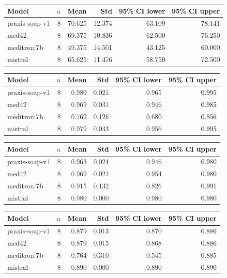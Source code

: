 \begin{tabular}{lrrrrr}
\toprule
Model & $n$ & Mean & Std & 95\% CI lower & 95\% CI upper \\
\midrule
praxis-soap-v1 & 8 & 70.625 & 12.374 & 63.109 & 78.141 \\
med42 & 8 & 69.375 & 10.836 & 62.500 & 76.250 \\
meditron:7b & 8 & 49.375 & 14.501 & 43.125 & 60.000 \\
mistral & 8 & 65.625 & 11.476 & 58.750 & 72.500 \\
\bottomrule
\end{tabular}

\begin{tabular}{lrrrrr}
\toprule
Model & $n$ & Mean & Std & 95\% CI lower & 95\% CI upper \\
\midrule
praxis-soap-v1 & 8 & 0.980 & 0.021 & 0.965 & 0.995 \\
med42 & 8 & 0.969 & 0.031 & 0.946 & 0.985 \\
meditron:7b & 8 & 0.769 & 0.126 & 0.680 & 0.856 \\
mistral & 8 & 0.979 & 0.033 & 0.956 & 0.995 \\
\bottomrule
\end{tabular}

\begin{tabular}{lrrrrr}
\toprule
Model & $n$ & Mean & Std & 95\% CI lower & 95\% CI upper \\
\midrule
praxis-soap-v1 & 8 & 0.963 & 0.024 & 0.946 & 0.980 \\
med42 & 8 & 0.969 & 0.021 & 0.954 & 0.980 \\
meditron:7b & 8 & 0.915 & 0.132 & 0.826 & 0.991 \\
mistral & 8 & 0.980 & 0.000 & 0.980 & 0.980 \\
\bottomrule
\end{tabular}

\begin{tabular}{lrrrrr}
\toprule
Model & $n$ & Mean & Std & 95\% CI lower & 95\% CI upper \\
\midrule
praxis-soap-v1 & 8 & 0.879 & 0.013 & 0.870 & 0.886 \\
med42 & 8 & 0.879 & 0.015 & 0.868 & 0.886 \\
meditron:7b & 8 & 0.764 & 0.310 & 0.545 & 0.885 \\
mistral & 8 & 0.890 & 0.000 & 0.890 & 0.890 \\
\bottomrule
\end{tabular}
